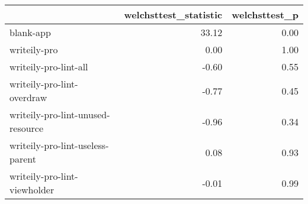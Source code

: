 \begin{tabular}{lrr}
\toprule
{} &  welchsttest\_statistic &  welchsttest\_p \\
\midrule
blank-app                         &                  33.12 &           0.00 \\
writeily-pro                      &                   0.00 &           1.00 \\
writeily-pro-lint-all             &                  -0.60 &           0.55 \\
writeily-pro-lint-overdraw        &                  -0.77 &           0.45 \\
writeily-pro-lint-unused-resource &                  -0.96 &           0.34 \\
writeily-pro-lint-useless-parent  &                   0.08 &           0.93 \\
writeily-pro-lint-viewholder      &                  -0.01 &           0.99 \\
\bottomrule
\end{tabular}
